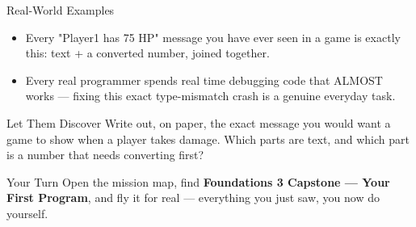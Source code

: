 \documentclass[aspectratio=169]{beamer}
\begin{document}
\begin{frame}{Real-World Examples}
    \large
    \begin{itemize}
        \item Every "Player1 has 75 HP" message you have ever seen in a game is exactly this: text + a converted number, joined together.
        \item Every real programmer spends real time debugging code that ALMOST works --- fixing this exact type-mismatch crash is a genuine everyday task.
    \end{itemize}
\end{frame}


\begin{frame}{Let Them Discover}
    \large
    Write out, on paper, the exact message you would want a game to show when a player takes damage. Which parts are text, and which part is a number that needs converting first?
\end{frame}

\begin{frame}{Your Turn}
    \Large
    Open the mission map, find \textbf{Foundations 3 Capstone — Your First Program}, and fly it for real ---
    everything you just saw, you now do yourself.
\end{frame}
\end{document}
